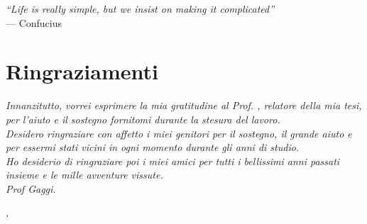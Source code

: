 \cleardoublepage
{}
{}

\begin{flushright}{
    \slshape
    ``Life is really simple, but we insist on making it complicated''} \\
    \medskip
    --- Confucius
\end{flushright}


\bigskip

\begingroup
\let\clearpage\relax
\let\cleardoublepage\relax
\let\cleardoublepage\relax

\chapter*{Ringraziamenti}

\noindent \textit{Innanzitutto, vorrei esprimere la mia gratitudine al Prof. \myProf, relatore della mia tesi, per l'aiuto e il sostegno fornitomi durante la stesura del lavoro.}\\

\noindent \textit{Desidero ringraziare con affetto i miei genitori per il sostegno, il grande aiuto e per essermi stati vicini in ogni momento durante gli anni di studio.}\\

\noindent \textit{Ho desiderio di ringraziare poi i miei amici per tutti i bellissimi anni passati insieme e le mille avventure vissute.}\\

\noindent \textit{Prof Gaggi.}\\
\bigskip

\noindent\textit{\myLocation, \myTime}
\hfill \myName

\endgroup
